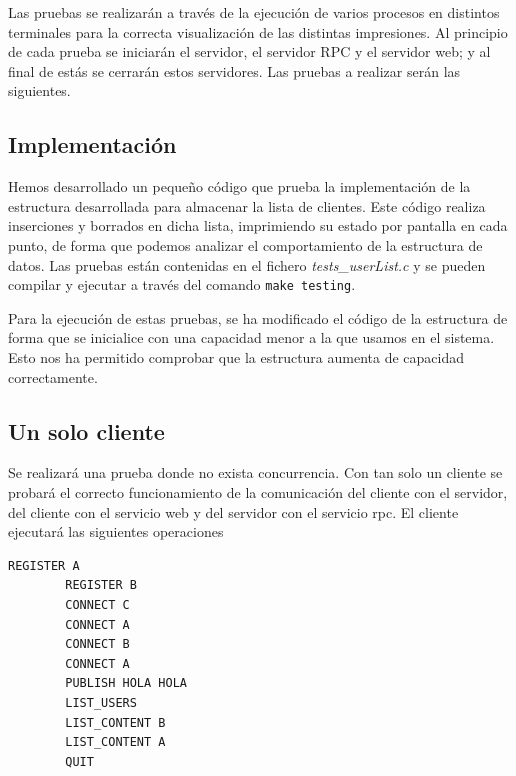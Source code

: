 \documentclass[]{article}
\begin{document}
Las pruebas se realizarán a través de la ejecución de varios procesos en distintos terminales para la correcta visualización de las distintas impresiones. Al principio de cada prueba se iniciarán el servidor, el servidor RPC y el servidor web; y al final de estás se cerrarán estos servidores.
Las pruebas a realizar serán las siguientes.
\subsection{Implementación}
\label{subsec:imp}
Hemos desarrollado un pequeño código que prueba la implementación de la estructura desarrollada para almacenar la lista de clientes. Este código realiza inserciones y borrados en dicha lista, imprimiendo su estado por pantalla en cada punto, de forma que podemos analizar el comportamiento de la estructura de datos. Las pruebas están contenidas en el fichero \textit{tests\_userList.c} y se pueden compilar y ejecutar a través del comando \texttt{make testing}. 

Para la ejecución de estas pruebas, se ha modificado el código de la estructura de forma que se inicialice con una capacidad menor a la que usamos en el sistema. Esto nos ha permitido comprobar que la estructura aumenta de capacidad correctamente.

\subsection{Un solo cliente}
\label{subsection:1_cliente}
Se realizará una prueba donde no exista concurrencia. Con tan solo un cliente se probará el correcto funcionamiento de la comunicación del cliente con el servidor, del cliente con el servicio web y del servidor con el servicio rpc.
El cliente ejecutará las siguientes operaciones
\begin{center}
    \begin{lstlisting}[caption=Operaciones a realizar por el cliente]
        REGISTER A
        REGISTER B
        CONNECT C
        CONNECT A
        CONNECT B
        CONNECT A
        PUBLISH HOLA HOLA 
        LIST_USERS
        LIST_CONTENT B
        LIST_CONTENT A
        QUIT
    \end{lstlisting}
\end{center}
\end{document}
